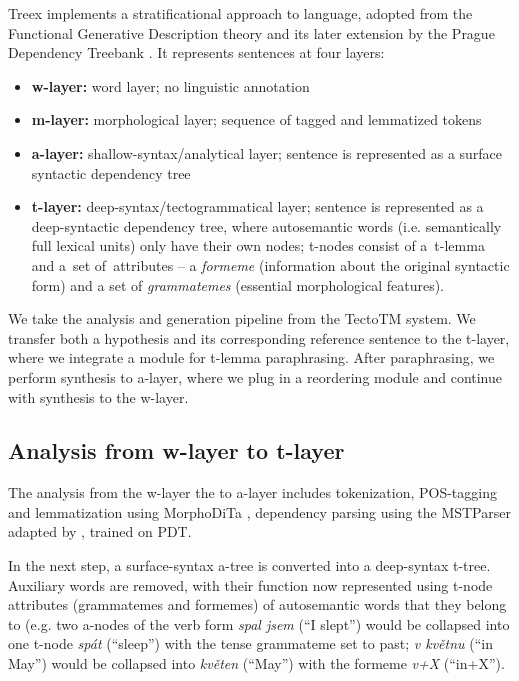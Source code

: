 Treex implements a stratificational approach to language, adopted from the 
Functional Generative Description theory \cite{FGP} and its later extension by 
the Prague Dependency Treebank \cite{PDT3.0}. It represents sentences at four 
layers:
\begin{itemize}
\item \textbf{w-layer:} word layer; no linguistic annotation
\item \textbf{m-layer:} morphological layer; sequence of tagged and lemmatized 
tokens
\item \textbf{a-layer:} shallow-syntax/analytical layer; sentence is 
represented as a surface syntactic dependency tree
\item \textbf{t-layer:} deep-syntax/tectogrammatical layer; sentence is 
represented as a deep-syntactic dependency tree, where autosemantic words (i.e.
semantically full lexical units) only have their own nodes; t-nodes consist of
a~t-lemma and a~set of~attributes -- a \textit{formeme} (information about the original syntactic form) and a set of \textit{grammatemes} 
(essential morphological features).
\end{itemize} 

We take the analysis and generation pipeline from the TectoTM system. We 
transfer both a hypothesis and its corresponding reference sentence to the 
t-layer, where we integrate a module for t-lemma paraphrasing. After 
paraphrasing, we perform synthesis to a-layer, where we plug in a reordering
module and continue with synthesis to the w-layer. 

\subsection{Analysis from w-layer to t-layer}
The analysis from the w-layer the to a-layer includes tokenization, POS-tagging and 
lemmatization using MorphoDiTa \cite{morphodita}, dependency parsing using the 
MSTParser \cite{McDonald:2005} adapted by , trained on PDT.

In the next step, a surface-syntax a-tree is converted into a deep-syntax 
t-tree. Auxiliary 
words are removed, with their function now represented using t-node attributes 
(grammatemes and formemes) of autosemantic words that they belong to (e.g. two
a-nodes of the verb form \textit{spal jsem} (``I slept'') would be collapsed 
into one t-node \textit{spát} (``sleep'') with the tense grammateme set to 
past; \textit{v květnu} (``in May'') would be collapsed into \textit{květen} 
(``May'') with the formeme \textit{v+X} (``in+X'').

